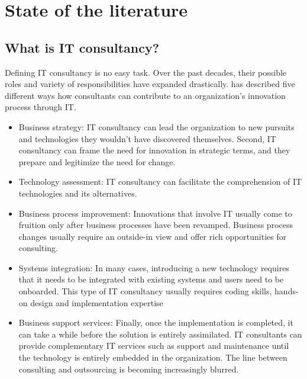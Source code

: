 \documentclass[12pt]{article}
\providecommand{\tightlist}{%
  \setlength{\itemsep}{0pt}\setlength{\parskip}{0pt}}
\begin{document}
\hypertarget{state-of-the-literature}{%
\section{State of the literature}\label{state-of-the-literature}}

\hypertarget{what-is-it-consultancy}{%
\subsection{What is IT consultancy?}\label{what-is-it-consultancy}}

Defining IT consultancy is no easy task. Over the past decades, their
possible roles and variety of responsibilities have expanded
drastically. \citet[20-25]{swanson2010} has described five different
ways how consultants can contribute to an organization's innovation
process through IT.

\begin{itemize}
\tightlist
\item
  Business strategy: IT consultancy can lead the organization to new
  pursuits and technologies they wouldn't have discovered themselves.
  Second, IT consultancy can frame the need for innovation in strategic
  terms, and they prepare and legitimize the need for change.
\item
  Technology assessment: IT consultancy can facilitate the comprehension
  of IT technologies and its alternatives.
\item
  Business process improvement: Innovations that involve IT usually come
  to fruition only after business processes have been revamped. Business
  process changes usually require an outside-in view and offer rich
  opportunities for consulting.
\item
  Systems integration: In many cases, introducing a new technology
  requires that it needs to be integrated with existing systems and
  users need to be onboarded. This type of IT consultancy usually
  requires coding skills, hands-on design and implementation expertise
\item
  Business support services: Finally, once the implementation is
  completed, it can take a while before the solution is entirely
  assimilated. IT consultants can provide complementary IT services such
  as support and maintenance until the technology is entirely embedded
  in the organization. The line between consulting and outsourcing is
  becoming increasingly blurred.
\end{itemize}
\end{document}
